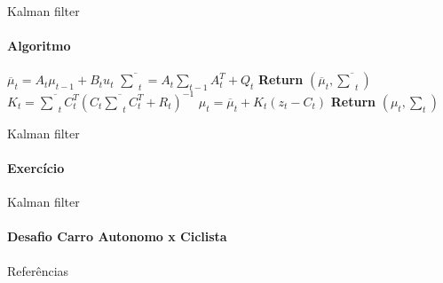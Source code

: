 \documentclass{beamer}
\begin{document}
\begin{frame}[c]{Kalman filter}
    \framesubtitle{Algoritmo}
    \begin{algorithm}[H]
        \caption{Kalman-filter}
        \label{array-sum}
        \begin{algorithmic}[1]
            \State $\overline{\mu}_t = A_t\mu_{t-1} + B_t u_t$
            \State $ \overline{\textstyle\sum}_t = A_t {\textstyle\sum}_{t-1} A_t^T+ Q_t$ 
            \State \textbf{Return} $\left(\overline{\mu}_t, \overline{\textstyle\sum}_t\right)$
        \EndProcedure
            \State $K_t = \overline{\textstyle\sum}_tC_t^T(C_t\overline{\textstyle\sum}_tC_t^T+R_t)^{-1}$
            \State $\mu_t  = \overline{\mu}_t + K_t(z_t -C_t)$
            \State \textbf{Return} $\left(\mu_t, \textstyle\sum_t\right)$
        \EndProcedure
        \end{algorithmic}
    \end{algorithm}
\end{frame}



\begin{frame}[c]{Kalman filter}
    \framesubtitle{Exercício}
\end{frame}


\begin{frame}[c]{Kalman filter}
    \framesubtitle{Desafio Carro Autonomo x Ciclista}
\end{frame}





\begin{frame}[t]{Referências}
\end{frame}
\end{document}
